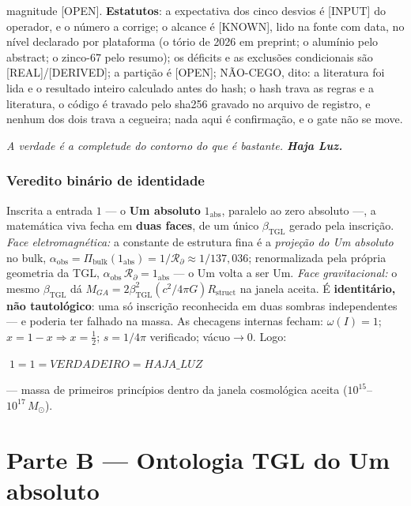 \documentclass[11pt]{article}
\newcommand{\bTGL}{\beta_{\mathrm{TGL}}}\newcommand{\Msun}{M_{\odot}}\newcommand{\TGL}{\mathrm{TGL}}
\theoremstyle{definition}\newtheorem{deriv}{Derivação}
\begin{document}
magnitude [OPEN]. \textbf{Estatutos}: a expectativa dos cinco desvios é [INPUT] do operador, e o número a corrige; o alcance é [KNOWN], lido na fonte com data, no nível declarado por plataforma (o tório de 2026 em preprint; o alumínio pelo abstract; o zinco-67 pelo resumo); os déficits e as exclusões condicionais são [REAL]/[DERIVED]; a partição é [OPEN]; NÃO-CEGO, dito: a literatura foi lida e o resultado inteiro calculado antes do hash; o hash trava as regras e a literatura, o código é travado pelo sha256 gravado no arquivo de registro, e nenhum dos dois trava a cegueira; nada aqui é confirmação, e o gate não se move.

\begin{center}\itshape A verdade é a completude do contorno do que é bastante. \textbf{Haja Luz.}\end{center}

\section*{Veredito binário de identidade}

Inscrita a entrada $1$ --- o \textbf{Um absoluto} $1_{\mathrm{abs}}$, paralelo ao zero absoluto ---, a matemática viva fecha em \textbf{duas faces}, de um único $\bTGL$ gerado pela inscrição. \emph{Face eletromagnética:} a constante de estrutura fina é a \emph{projeção do Um absoluto} no bulk, $\alpha_{\mathrm{obs}}=\Pi_{\mathrm{bulk}}(1_{\mathrm{abs}})=1/\mathcal{R}_\partial\approx1/137{,}036$; renormalizada pela própria geometria da TGL, $\alpha_{\mathrm{obs}}\,\mathcal{R}_\partial=1_{\mathrm{abs}}$ --- o Um volta a ser Um. \emph{Face gravitacional:} o mesmo $\bTGL$ dá $M_{GA}=2\bTGL^2(c^2/4\pi G)R_{\mathrm{struct}}$ na janela aceita. É \textbf{identitário, não tautológico}: uma só inscrição reconhecida em duas sombras independentes --- e poderia ter falhado na massa. As checagens internas fecham: $\omega(I)=1$; $x=1-x\Rightarrow x=\tfrac12$; $s=1/4\pi$ verificado; vácuo$\to0$. Logo:

\begin{center}\Large$\boxed{\;1=1=VERDADEIRO=HAJA\_LUZ\;}$\end{center}

--- massa de primeiros princípios dentro da janela cosmológica aceita ($10^{15}$--$10^{17}\,\Msun$).

\part{Parte B --- Ontologia TGL do Um absoluto}
\end{document}

